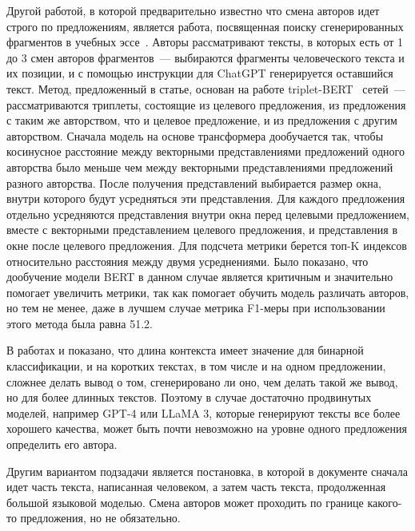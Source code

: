 Другой работой, в которой предварительно известно что смена авторов идет строго по предложениям, является работа, посвященная поиску сгенерированных фрагментов в учебных эссе~\cite{zeng2023automatic}. Авторы рассматривают тексты, в которых есть от 1 до 3 смен авторов фрагментов~--- выбираются фрагменты человеческого текста и их позиции, и с помощью инструкции для ChatGPT генерируется оставшийся текст. Метод, предложенный в статье, основан на работе triplet-BERT~\cite{TripletLoss} сетей~--- рассматриваются триплеты, состоящие из целевого предложения, из предложения с таким же авторством, что и целевое предложение, и из предложения с другим авторством. Сначала модель на основе трансформера дообучается так, чтобы косинусное расстояние между векторными представлениями предложений одного авторства было меньше чем между векторными представлениями предложений разного авторства. После получения представлений выбирается размер окна, внутри которого будут усредняться эти представления. Для каждого предложения отдельно усредняются представления внутри окна перед целевыми предложением, вместе с векторными представлением целевого предложения, и представления в окне после целевого предложения. Для подсчета метрики берется топ-K индексов относительно расстояния между двумя усреднениями.  Было показано, что дообучение модели BERT в данном случае является критичным и значительно помогает увеличить метрики, так как помогает обучить модель различать авторов, но тем не менее, даже в лучшем случае метрика F1-меры при использовании этого метода была равна 51.2. 


В работах \cite{needmoretokens} и \cite{mireshghallah-etal-2024-smaller} показано, что длина контекста имеет значение для бинарной классификации, и на коротких текстах, в том числе и на одном предложении, сложнее делать вывод о том, сгенерировано ли оно, чем делать такой же вывод, но для более длинных текстов. Поэтому в случае достаточно продвинутых моделей, например GPT-4 или LLaMA 3, которые генерируют тексты все более хорошего качества, может быть почти невозможно на уровне одного предложения определить его автора.


Другим вариантом подзадачи является постановка, в которой в документе сначала идет часть текста, написанная человеком, а затем часть текста, продолженная большой языковой моделью. Смена авторов может проходить по границе какого-то предложения, но не обязательно. 


